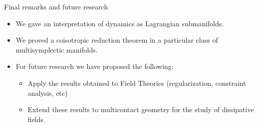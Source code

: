 \begin{frame}{Final remarks and future research}
\begin{itemize}
    \item We gave an interpretation of dynamics as Lagrangian submanifolds.
    \item We proved a coisotropic reduction theorem in a particular class of multisymplectic manifolds.
    \item For future research we have proposed the following: 
    \begin{itemize}
        \item Apply the results obtained to Field Theories (regularization, constraint analysis, etc)
        \item Extend these results to multicontact geometry for the study of dissipative fields.
    \end{itemize}
\end{itemize}
\end{frame}